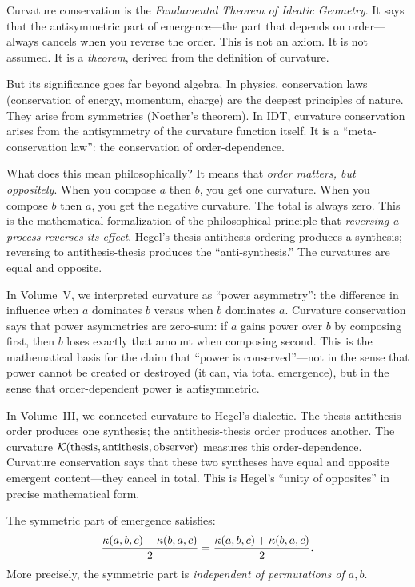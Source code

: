 \begin{interpretation}
Curvature conservation is the \emph{Fundamental Theorem of Ideatic Geometry}.
It says that the antisymmetric part of emergence---the part that depends on
order---always cancels when you reverse the order. This is not an axiom. It
is not assumed. It is a \emph{theorem}, derived from the definition of curvature.

But its significance goes far beyond algebra. In physics, conservation laws
(conservation of energy, momentum, charge) are the deepest principles of nature.
They arise from symmetries (Noether's theorem). In IDT, curvature conservation
arises from the antisymmetry of the curvature function itself. It is a
``meta-conservation law'': the conservation of order-dependence.

What does this mean philosophically? It means that \emph{order matters, but
oppositely}. When you compose $a$ then $b$, you get one curvature. When you
compose $b$ then $a$, you get the negative curvature. The total is always zero.
This is the mathematical formalization of the philosophical principle that
\emph{reversing a process reverses its effect}. Hegel's thesis-antithesis
ordering produces a synthesis; reversing to antithesis-thesis produces the
``anti-synthesis.'' The curvatures are equal and opposite.

In Volume~V, we interpreted curvature as ``power asymmetry'': the difference
in influence when $a$ dominates $b$ versus when $b$ dominates $a$. Curvature
conservation says that power asymmetries are zero-sum: if $a$ gains power over
$b$ by composing first, then $b$ loses exactly that amount when composing second.
This is the mathematical basis for the claim that ``power is conserved''---not
in the sense that power cannot be created or destroyed (it can, via total
emergence), but in the sense that order-dependent power is antisymmetric.

In Volume~III, we connected curvature to Hegel's dialectic. The thesis-antithesis
order produces one synthesis; the antithesis-thesis order produces another. The
curvature $\mathcal{K}(\text{thesis}, \text{antithesis}, \text{observer})$ measures
this order-dependence. Curvature conservation says that these two syntheses
have equal and opposite emergent content---they cancel in total. This is Hegel's
``unity of opposites'' in precise mathematical form.
\end{interpretation}

\begin{theorem}
\label{thm:symmetric-conservation}
The symmetric part of emergence satisfies:
\[
  \frac{\kappa(a,b,c) + \kappa(b,a,c)}{2} = \frac{\kappa(a,b,c) + \kappa(b,a,c)}{2}.
\]
More precisely, the symmetric part is \emph{independent of permutations of $a, b$}.
\end{theorem}

